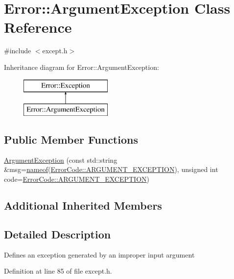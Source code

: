 \hypertarget{class_error_1_1_argument_exception}{}\section{Error\+:\+:Argument\+Exception Class Reference}
\label{class_error_1_1_argument_exception}


{\ttfamily \#include $<$except.\+h$>$}

Inheritance diagram for Error\+:\+:Argument\+Exception\+:\begin{figure}[H]
\begin{center}
\leavevmode
\includegraphics[height=2.000000cm]{class_error_1_1_argument_exception}
\end{center}
\end{figure}
\subsection*{Public Member Functions}
\begin{DoxyCompactItemize}
\item 
\hyperlink{class_error_1_1_argument_exception_a8f9378ee53dbfc35253d3b3e9625ad3e}{Argument\+Exception} (const std\+::string \&msg=\hyperlink{macros_8h_a235bdec0a6bf62f3b3af87e528109847}{nameof}(\hyperlink{namespace_error_1_1_error_code_acf46c5671e39c66ef96a9a701c8cb91f}{Error\+Code\+::\+A\+R\+G\+U\+M\+E\+N\+T\+\_\+\+E\+X\+C\+E\+P\+T\+I\+ON}), unsigned int code=\hyperlink{namespace_error_1_1_error_code_acf46c5671e39c66ef96a9a701c8cb91f}{Error\+Code\+::\+A\+R\+G\+U\+M\+E\+N\+T\+\_\+\+E\+X\+C\+E\+P\+T\+I\+ON})
\end{DoxyCompactItemize}
\subsection*{Additional Inherited Members}


\subsection{Detailed Description}
Defines an exception generated by an improper input argument 

Definition at line 85 of file except.\+h.



